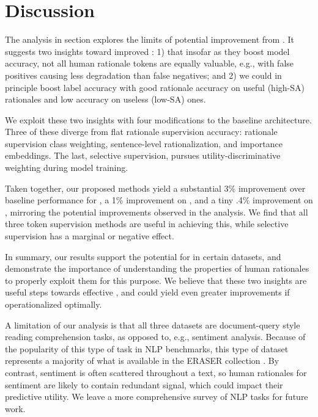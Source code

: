 \section{Discussion}


The analysis in section  explores the limits of potential improvement from \learningfromexplanation. 
It suggests two insights toward improved \learningfromexplanation: 1) 
that insofar as they boost model accuracy, 
not all human rationale tokens are equally valuable, e.g., with false positives causing less degradation than false negatives; 
and 2) we could in principle boost label accuracy with good rationale accuracy on useful (high-SA) rationales and low accuracy on useless (low-SA) ones. 

We exploit these two insights with four modifications to the baseline architecture. Three of these diverge from flat rationale supervision accuracy: rationale supervision class weighting, sentence-level rationalization, and importance embeddings. The last, selective supervision, pursues utility-discriminative weighting during model training. 

Taken together, our proposed methods yield a substantial 3\% improvement over baseline performance for \multirc, a 1\% improvement on \fever, and a tiny .4\% improvement on \esnli, mirroring the potential improvements observed in the analysis. We find that all three token supervision methods are useful in achieving this, while selective supervision has a marginal or negative effect. 


In summary, our results support the potential for \learningfromexplanation in certain datasets, and demonstrate the importance of understanding the properties of human rationales to properly exploit them for this purpose.
We believe that these two insights are useful steps towards effective \learningfromexplanation, and could yield even greater improvements if operationalized optimally.

A limitation of our analysis is that all three datasets are document-query style reading comprehension tasks, as opposed to, e.g., sentiment analysis. Because of the popularity of this type of task in NLP benchmarks, this type of dataset represents a majority of what is available in 
the ERASER collection \cite{deyoung_eraser_2019}. By contrast, sentiment is often scattered throughout a text, so human rationales for sentiment are likely to contain redundant signal, which could impact their predictive utility. We leave a more comprehensive survey of NLP tasks for future work. 



